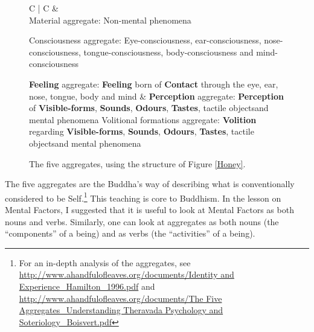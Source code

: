 \begin{figure}[H]
\begin{tabular*}{\textwidth}{C{\tabcolsep} | C{\tabcolsep}}
\toprule
{} &  \\
\midrule
Material aggregate:\newline
 Non-mental phenomena\newline\vspace{5mm}
 
 Consciousness aggregate:\newline
 Eye-consciousness, ear-consciousness, nose-consciousness, tongue-consciousness, body-consciousness and mind-consciousness\newline\vspace{5mm}
 
 \textbf{Feeling} aggregate:\newline
 \textbf{Feeling} born of \textbf{Contact} through the eye, ear, nose, tongue, body and mind
 &
 \textbf{Perception} aggregate:\newline
 \textbf{Perception} of \textbf{Visible-forms}, \textbf{Sounds}, \textbf{Odours}, \textbf{Tastes}, tactile objects\newline and mental phenomena
 \newline\vspace{5mm}
 Volitional formations aggregate:\newline
 \textbf{Volition} regarding \textbf{Visible-forms}, \textbf{Sounds}, \textbf{Odours}, \textbf{Tastes}, tactile objects\newline and mental phenomena
 \\
 
\bottomrule
\end{tabular*}
\caption{The five aggregates, using the structure of Figure \ref{Honey}.}
\label{Aggregates}
\end{figure}

The five aggregates are the Buddha’s way of describing what is conventionally considered to be Self.\footnote{For an in-depth analysis of the aggregates, see \url{http://www.ahandfulofleaves.org/documents/Identity and Experience_Hamilton_1996.pdf} and \url{http://www.ahandfulofleaves.org/documents/The Five Aggregates_Understanding Theravada Psychology and Soteriology_Boisvert.pdf}} This teaching is core to Buddhism. In the lesson on Mental Factors, I suggested that it is useful to look at Mental Factors as both nouns and verbs. Similarly, one can look at aggregates as both nouns (the “components” of a being) and as verbs (the “activities” of a being).


